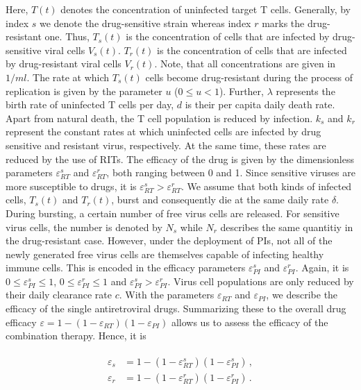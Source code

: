 Here, $T(t)$ denotes the concentration of uninfected target T cells.
Generally, by index $s$ we denote the drug-sensitive strain whereas index $r$ marks the drug-resistant one.
Thus, $T_s(t)$ is the concentration of cells that are infected by drug-sensitive viral cells $V_s(t)$.
$T_r(t)$ is the concentration of cells that are infected by drug-resistant viral cells $V_r(t)$.
Note, that all concentrations are given in $1/ml$.
The rate at which $T_s(t)$ cells become drug-resistant during the process of replication is given by the parameter $u$ ($0 \leq u < 1$).\newline
Further, $\lambda$ represents the birth rate of uninfected T cells per day, $d$ is their per capita daily death rate.
Apart from natural death, the T cell population is reduced by infection. $k_s$ and $k_r$ represent the constant rates at which 
uninfected cells are infected by drug sensitive and resistant virus, respectively.
At the same time, these rates are reduced by the use of RITs. The efficacy of the drug is given by the dimensionless 
parameters $\varepsilon_{RT}^{s}$ and $\varepsilon_{RT}^{r}$, both ranging between 0 and 1.
Since sensitive viruses are more susceptible to drugs, it is $\varepsilon_{RT}^{s} > \varepsilon_{RT}^{r}$.\newline
We assume that both kinds of infected cells, $T_s(t)$ and $T_r(t)$, burst and consequently die at the same daily rate $\delta$.
During bursting, a certain number of free virus cells are released. For sensitive virus cells, the number is denoted by $N_s$ 
while $N_r$ describes the same quantitiy in the drug-resistant case.
However, under the deployment of PIs, not all of the newly generated free virus cells are themselves capable of infecting healthy immune 
cells. This is encoded in the efficacy parameters $\varepsilon_{PI}^s$ and $\varepsilon_{PI}^r$. Again, it is $0 \leq \varepsilon_{PI}^s \leq 1$, 
$0 \leq \varepsilon_{PI}^r \leq 1$ and $\varepsilon_{PI}^s > \varepsilon_{PI}^r$.
Virus cell populations are only reduced by their daily clearance rate $c$.\newline
With the parameters $\varepsilon_{RT}$ and $\varepsilon_{PI}$, we describe the efficacy of the single antiretroviral drugs.
Summarizing these to the overall drug efficacy $\varepsilon = 1 - (1-\varepsilon_{RT})(1-\varepsilon_{PI})$ allows us to assess the efficacy of 
the combination therapy.
Hence, it is

\begin{align}
    \begin{split}
        \varepsilon_s &= 1 - (1-\varepsilon_{RT}^s)(1-\varepsilon_{PI}^s)\, ,\\
        \varepsilon_r &= 1 - (1-\varepsilon_{RT}^r)(1-\varepsilon_{PI}^r) \,\text{.}
    \end{split}
    \label{ref:epsilon_HAART}
\end{align}


